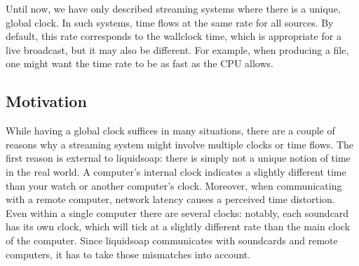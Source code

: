 
Until now, we have only described streaming systems where there is
a unique, global clock. In such systems, time flows at the same rate
for all sources.
By default, this rate corresponds to the wallclock time,
which is appropriate for a live broadcast,
but it may also be different.
For example, when producing a file, one might want the time rate
to be as fast as the CPU allows.

\subsection{Motivation}

While having a global clock suffices in many situations,
there are a couple of reasons why a streaming system might involve multiple
clocks or time flows.
The first reason is external to liquidsoap: there is simply
not a unique notion of time in the real world.
A computer's internal clock indicates a slightly different time
than your watch or another computer's clock.
Moreover, when communicating with a remote computer, network
latency causes a perceived time distortion.
Even within a single computer there are several clocks: notably, each
soundcard has its own clock, which will tick at a slightly different
rate than the main clock of the computer.
Since liquidsoap communicates with soundcards and remote computers,
it has to take those mismatches into account.

